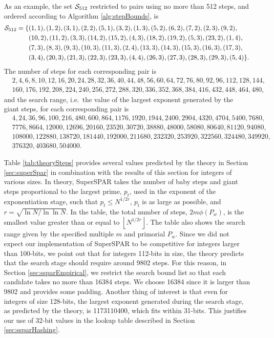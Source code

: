 \documentclass{ucalgthes1}
\theoremstyle{definition}
\newcommand{\floor}[1]{\left\lfloor #1 \right\rfloor}
\begin{document}
As an example, the set $\mathcal S_{512}$ restricted to pairs using no more than 512 steps, and ordered according to Algorithm \ref{alg:stepBounds}, is
\begin{align*}
\mathcal S_{512} = \{&(1,1),(1,2),(3,1),(2,2),(5,1),(3,2),(1,3),(5,2),(6,2),(7,2),(2,3),(9,2), \\
&(10,2),(11,2),(3,3),(14,2),(15,2),(4,3),(18,2),(19,2),(5,3),(23,2),(1,4), \\
&(7,3),(8,3),(9,3),(10,3),(11,3),(2,4),(13,3),(14,3),(15,3),(16,3),(17,3), \\
&(3,4),(20,3),(21,3),(22,3),(23,3),(4,4),(26,3),(27,3),(28,3),(29,3),(5,4)\}.
\end{align*}
The number of steps for each corresponding pair is
\begin{align*}
&2,4,6,8,10,12,16,20,24,28,32,36,40,44,48,56,60,64,72,76,80,92,96,112,128,144,\\
&160,176,192,208,224,240,256,272,288,320,336,352,368,384,416,432,448,464,480,
\end{align*}
and the search range, i.e.\ the value of the largest exponent generated by the giant steps, for each corresponding pair is
\begin{align*}
&4,24,36,96,100,216,480,600,864,1176,1920,1944,2400,2904,4320,4704,5400,7680,\\
&7776,8664,12000,12696,20160,23520,30720,38880,48000,58080,80640,81120,94080,\\
&108000,122880,138720,181440,192000,211680,232320,253920,322560,324480,349920,\\
&376320,403680,504000.
\end{align*}

Table \ref{tab:theorySteps} provides several values predicted by the theory in Section \ref{sec:superSpar} in combination with the results of this section for integers of various sizes.  In theory, SuperSPAR takes the number of baby steps and giant steps proportional to the largest prime, $p_t$, used in the exponent of the exponentiation stage, such that $p_t \le N^{1/2r}$, $p_t$ is as large as possible, and $r = \sqrt{\ln N / \ln \ln N}$.  In the table, the total number of steps, $2m\phi(P_w)$, is the smallest value greater than or equal to $\floor{N^{1/2r}}$.  The table also shows the search range given by the specified multiple $m$ and primorial $P_w$.  Since we did not expect our implementation of SuperSPAR to be competitive for integers larger than 100-bits, we point out that for integers 112-bits in size, the theory predicts that the search stage should require around 9802 steps.  For this reason, in Section \ref{sec:ssparEmpirical}, we restrict the search bound list so that each candidate takes no more than 16384 steps.  We choose 16384 since it is larger than 9802 and provides some padding.  Another thing of interest is that even for integers of size 128-bits, the largest exponent generated during the search stage, as predicted by the theory, is 1173110400, which fits within 31-bits.  This justifies our use of 32-bit values in the lookup table described in Section \ref{sec:ssparHashing}.
\end{document}

